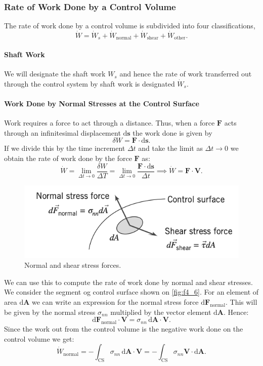 \subsubsection{Rate of Work Done by a Control Volume}
The rate of work done by a control volume is subdivided into four classifications,
\[ 
\dot{W} = \dot{W}_s + \dot{W}_{\mathrm{normal}} + \dot{W}_{\mathrm{shear}} + \dot{W}_{\mathrm{other}}
.\]

\paragraph{Shaft Work}
We will designate the shaft work $W_s$ and hence the rate of work transferred out through the control system by shaft work is designated $\dot{W}_s$.

\paragraph{Work Done by Normal Stresses at the Control Surface}
Work requires a force to act through a distance. Thus, when a force $\textbf{F}$ acts through an infinitesimal displacement $\mathrm{d}\textbf{s}$ the work done is given by
\[ 
\delta W = \textbf{F} \cdot \mathrm{d}\textbf{s}
.\]
If we divide this by the time increment $\Delta t$ and take the limit as $\Delta t \to 0$ we obtain the rate of work done by the force $\textbf{F}$ as:
\[ 
\dot{W} = \lim_{\Delta t \to 0} \frac{\delta W}{\Delta T} = \lim_{\Delta t \to 0}  \frac{\textbf{F} \cdot \mathrm{d}\textbf{s}}{\Delta t} \implies \dot{W} = \textbf{F} \cdot \textbf{V}
.\]
\begin{figure} [ht]
  \centering
  \includegraphics[width=0.5\linewidth]{./figures/f4_6.png}
  \caption{Normal and shear stress forces.}
  \label{fig:f4_6}
\end{figure}

We can use this to compute the rate of work done by normal and shear stresses. We consider the segment og control surface shown on \autoref{fig:f4_6}. For an element of area $\mathrm{d}\textbf{A}$ we can write an expression for the normal stress force $\mathrm{d}\textbf{F}_{\mathrm{normal}}$. This will be given by the normal stress $\sigma_{nn}$ multiplied by the vector element $\mathrm{d}\textbf{A}$. Hence:
\[ 
\mathrm{d}\textbf{F}_{\mathrm{normal}} \cdot \textbf{V} = \sigma_{nn} \, \mathrm{d}\textbf{A} \cdot \textbf{V}
.\]
Since the work out from the control volume is the negative work done on the control volume we get:
\[ 
\dot{W}_{\mathrm{normal}} = - \int_{\mathrm{CS}} \sigma_{nn} \, \mathrm{d}\textbf{A} \cdot \textbf{V} = -\int_{\mathrm{CS}} \sigma_{nn} \textbf{V} \cdot \mathrm{d}\textbf{A}
.\]

